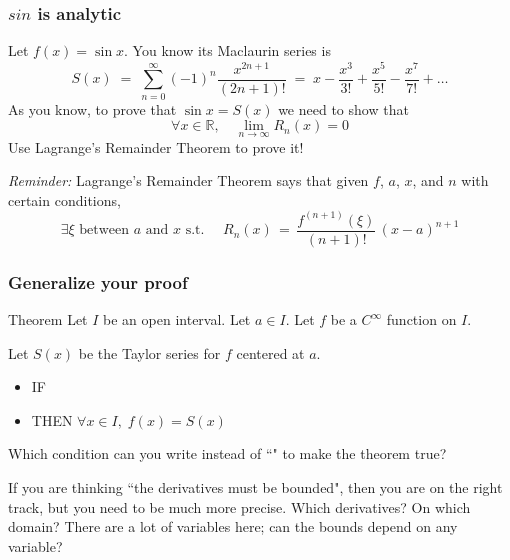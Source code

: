 \begin{frame}
	\fontsize{13}{13}\selectfont
	\frametitle{$sin$ is analytic}

	Let $\displaystyle f(x) = \sin x$. You know its Maclaurin series is
	\[
		S(x) \; =\; \sum_{n=0}^{\infty}(-1)^{n}\frac{x^{2n+1}}{(2n+1)!}\; = \; x - \frac{x^{3}}{3!}
		+ \frac{x^{5}}{5!}- \frac{x^{7}}{7!}+ \ldots
	\]
	As you know, to prove that $\displaystyle \sin x = S(x)$ we need to show that
	\[
		\forall x \in \mathbb{R}, \quad \lim_{n \to \infty}R_{n}(x) = 0
	\]
	Use Lagrange's Remainder Theorem to prove it!

	\hrulefill

	\emph{Reminder:} Lagrange's Remainder Theorem says that given $f$, $a$, $x$,
	and $n$ with certain conditions,
	\begin{equation*}
		\exists \xi \text{ between $a$ and $x$ s.t. }\quad R_{n}(x) \, = \, \frac{f^{(n+1)}(\xi)}{(n+1)!}
		\, (x-a)^{n+1}
	\end{equation*}
\end{frame}

\begin{frame}[t]
	\fontsize{13}{13}\selectfont
	\frametitle{Generalize your proof}

	\begin{block}{Theorem}
		Let $I$ be an open interval. Let $a \in I$. Let $f$ be a $C^{\infty}$ function
		on $I$.

		Let $S(x)$ be the Taylor series for $f$ centered at $a$.

		\begin{itemize}
			\item IF 

			\item THEN $\displaystyle \forall x \in I, \; f(x) = S(x)$
		\end{itemize}
	\end{block}
	\vspace{.2cm}

	Which condition can you write instead of ``" to make the theorem
	true?

	\vspace{.2cm}

	If you are thinking ``the derivatives must be bounded", then you are on the right
	track, but you need to be much more precise. Which derivatives? On which
	domain? There are a lot of variables here; can the bounds depend on any
	variable?
\end{frame}

